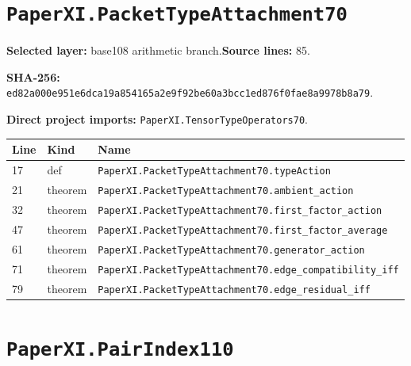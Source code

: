 \documentclass[10pt,oneside]{book}
\begin{document}
\section{\texorpdfstring{\nolinkurl{PaperXI.PacketTypeAttachment70}}{PaperXI.PacketTypeAttachment70}}\label{module:PaperXI.PacketTypeAttachment70}

\textbf{Selected layer:} base108 arithmetic branch.\quad\textbf{Source lines:} 85.\par\textbf{SHA-256:} {\scriptsize\nolinkurl{ed82a000e951e6dca19a854165a2e9f92be60a3bcc1ed876f0fae8a9978b8a79}}.


\textbf{Direct project imports:} \nolinkurl{PaperXI.TensorTypeOperators70}.

\begin{longtable}{@{}p{}p{}p{}@{}}\toprule Line&Kind&Name\\\midrule\endhead

17&def&\nolinkurl{PaperXI.PacketTypeAttachment70.typeAction}\\

21&theorem&\nolinkurl{PaperXI.PacketTypeAttachment70.ambient_action}\\

32&theorem&\nolinkurl{PaperXI.PacketTypeAttachment70.first_factor_action}\\

47&theorem&\nolinkurl{PaperXI.PacketTypeAttachment70.first_factor_average}\\

61&theorem&\nolinkurl{PaperXI.PacketTypeAttachment70.generator_action}\\

71&theorem&\nolinkurl{PaperXI.PacketTypeAttachment70.edge_compatibility_iff}\\

79&theorem&\nolinkurl{PaperXI.PacketTypeAttachment70.edge_residual_iff}\\

\bottomrule\end{longtable}

\section{\texorpdfstring{\nolinkurl{PaperXI.PairIndex110}}{PaperXI.PairIndex110}}\label{module:PaperXI.PairIndex110}
\end{document}
